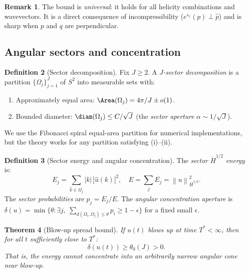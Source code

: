 \documentclass[11pt]{article}
\newtheorem{theorem}{Theorem}[section]
\theoremstyle{definition}
\newtheorem{definition}[theorem]{Definition}
\newtheorem{remark}[theorem]{Remark}
\newcommand{\norm}[1]{\left\| #1 \right\|}
\newcommand{\Hdot}[1]{\dot{H}^{#1}}
\begin{document}
\begin{remark}
The bound is \emph{universal}: it holds for all helicity
combinations and wavevectors.  It is a direct consequence
of incompressibility ($e^{s_1}(p) \perp \hat{p}$) and is
sharp when $p$ and $q$ are perpendicular.
\end{remark}


\subsection{Angular sectors and concentration}

\begin{definition}[Sector decomposition]
\label{def:sectors}
Fix $J \geq 2$.  A \emph{$J$-sector decomposition} is a
partition $\{\Omega_j\}_{j=1}^J$ of $S^2$ into measurable
sets with:
\begin{enumerate}[label=(\roman*)]
\item Approximately equal area:
$\Area(\Omega_j) = 4\pi/J \pm o(1)$.
\item Bounded diameter: $\diam(\Omega_j) \leq C/\sqrt{J}$
(the \emph{sector aperture} $\alpha \sim 1/\sqrt{J}$).
\end{enumerate}
\end{definition}

We use the Fibonacci spiral equal-area partition for
numerical implementations, but the theory works for any
partition satisfying (i)--(ii).

\begin{definition}[Sector energy and angular concentration]
\label{def:sector-energy}
The \emph{sector $\Hdot{1/2}$ energy} is:
\begin{equation}
E_j = \sum_{\hat{k}\in\Omega_j} |k|\,|\hat{u}(k)|^2,
\quad E = \sum_j E_j = \norm{u}_{\Hdot{1/2}}^2.
\end{equation}
The \emph{sector probabilities} are $p_j = E_j/E$.
The \emph{angular concentration aperture} is
$\delta(u) = \min\{\theta : \exists j,\;
\sum_{d(\Omega_i,\Omega_j)\leq\theta} p_i \geq 1-\epsilon\}$
for a fixed small $\epsilon$.
\end{definition}

\begin{theorem}[Blow-up spread bound]
\label{thm:spread-bound}
If $u(t)$ blows up at time $T^* < \infty$, then for all
$t$ sufficiently close to $T^*$:
\begin{equation}\label{eq:spread}
\delta(u(t)) \geq \theta_0(J) > 0.
\end{equation}
That is, the energy cannot concentrate into an arbitrarily
narrow angular cone near blow-up.
\end{theorem}
\end{document}
